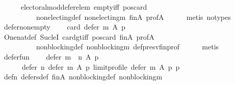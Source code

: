 \begin{isabellebody}
\ \ \ \ \isamarkupfalse%
\ electoral{\isacharunderscore}{\kern0pt}mod{\isacharunderscore}{\kern0pt}defer{\isacharunderscore}{\kern0pt}elem\ empty{\isacharunderscore}{\kern0pt}iff\ pos{\isacharunderscore}{\kern0pt}card\isanewline
\ \ \ \ \ \ \ \ \ \ non{\isacharunderscore}{\kern0pt}electing{\isacharunderscore}{\kern0pt}def\ non{\isacharunderscore}{\kern0pt}electing{\isacharunderscore}{\kern0pt}m\ fin{\isacharunderscore}{\kern0pt}A\ prof{\isacharunderscore}{\kern0pt}A\isanewline
\ \ \ \ \isamarkupfalse%
\ {\isacharparenleft}{\kern0pt}metis\ {\isacharparenleft}{\kern0pt}no{\isacharunderscore}{\kern0pt}types{\isacharparenright}{\kern0pt}{\isacharparenright}{\kern0pt}\isanewline
\ \ \isamarkupfalse%
\ defer{\isacharunderscore}{\kern0pt}non{\isacharunderscore}{\kern0pt}empty{\isacharcolon}{\kern0pt}\isanewline
\ \ \ \ {\isachardoublequoteopen}card\ {\isacharparenleft}{\kern0pt}defer\ m\ A\ p{\isacharparenright}{\kern0pt}\ {\isasymge}\ {}{\isachardoublequoteclose}\isanewline
\ \ \ \ \isamarkupfalse%
\ One{\isacharunderscore}{\kern0pt}nat{\isacharunderscore}{\kern0pt}def\ Suc{\isacharunderscore}{\kern0pt}leI\ card{\isacharunderscore}{\kern0pt}gt{\isacharunderscore}{\kern0pt}{}{\isacharunderscore}{\kern0pt}iff\ pos{\isacharunderscore}{\kern0pt}card\ fin{\isacharunderscore}{\kern0pt}A\ prof{\isacharunderscore}{\kern0pt}A\isanewline
\ \ \ \ \ \ \ \ \ \ non{\isacharunderscore}{\kern0pt}blocking{\isacharunderscore}{\kern0pt}def\ non{\isacharunderscore}{\kern0pt}blocking{\isacharunderscore}{\kern0pt}m\ def{\isacharunderscore}{\kern0pt}presv{\isacharunderscore}{\kern0pt}fin{\isacharunderscore}{\kern0pt}prof\isanewline
\ \ \ \ \isamarkupfalse%
\ metis\isanewline
\ \ \isamarkupfalse%
\ defer{\isacharunderscore}{\kern0pt}fun{\isacharcolon}{\kern0pt}\isanewline
\ \ \ \ {\isachardoublequoteopen}defer\ {\isacharparenleft}{\kern0pt}m\ {\isasymtriangleright}\ n{\isacharparenright}{\kern0pt}\ A\ p\ {\isacharequal}{\kern0pt}\isanewline
\ \ \ \ \ \ defer\ n\ {\isacharparenleft}{\kern0pt}defer\ m\ A\ p{\isacharparenright}{\kern0pt}\ {\isacharparenleft}{\kern0pt}limit{\isacharunderscore}{\kern0pt}profile\ {\isacharparenleft}{\kern0pt}defer\ m\ A\ p{\isacharparenright}{\kern0pt}\ p{\isacharparenright}{\kern0pt}{\isachardoublequoteclose}\isanewline
\ \ \ \ \isamarkupfalse%
\ def{\isacharunderscore}{\kern0pt}{}{\isacharunderscore}{\kern0pt}n\ defers{\isacharunderscore}{\kern0pt}def\ fin{\isacharunderscore}{\kern0pt}A\ non{\isacharunderscore}{\kern0pt}blocking{\isacharunderscore}{\kern0pt}def\ non{\isacharunderscore}{\kern0pt}blocking{\isacharunderscore}{\kern0pt}m\isanewline

\end{isabellebody}
